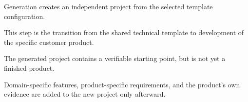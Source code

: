 \begin{beginnerstatement}

Generation creates an independent project from the selected template
configuration.

This step is the transition from the shared technical template to development
of the specific customer product.

The generated project contains a verifiable starting point, but is not yet a
finished product.

Domain-specific features, product-specific requirements, and the product's own
evidence are added to the new project only afterward.

\end{beginnerstatement}
